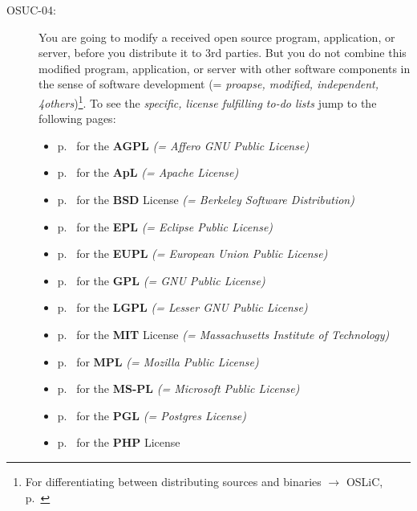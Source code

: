 \begin{description}
\item[OSUC-04:]\label{OSUC-04-DEF} You are going to modify a received open
source program, application, or server, before you distribute it to 3rd parties.
But you do not combine this modified program, application, or server with other
software components in the sense of software development (= \textit{proapse,
modified, independent, 4others})\footnote{For differentiating between
distributing sources and binaries $\rightarrow$ OSLiC, p.\
\pageref{sec:SourceBinaryDifference}}.
To see the \textit{specific, license fulfilling to-do lists} jump to the
following pages:
  \begin{itemize}
    \item p.\ \pageref{OSUC-04-AGPL} for the \textbf{AGPL}
      \textit{(= Affero GNU Public License)} 
    \item p.\ \pageref{OSUC-04-Apache20} for the \textbf{ApL}
      \textit{(= Apache License)}
    \item p.\ \pageref{OSUC-04-BSD} for the \textbf{BSD} License
      \textit{(= Berkeley Software Distribution)}
    \item p.\ \pageref{OSUC-04-EPL} for the \textbf{EPL}
      \textit{(= Eclipse Public License)}     
    \item p.\ \pageref{OSUC-04-EUPL} for the \textbf{EUPL}
      \textit{(= European Union Public License)} 
    \item p.\ \pageref{OSUC-04-GPL} for the \textbf{GPL}
       \textit{(= GNU Public License)} 
    \item p.\ \pageref{OSUC-04-LGPL} for the \textbf{LGPL}
      \textit{(= Lesser GNU Public License)}           
    \item p.\ \pageref{OSUC-04-MIT} for the \textbf{MIT} License
       \textit{(= Massachusetts Institute of Technology)} 
    \item p.\ \pageref{OSUC-04-MPL} for \textbf{MPL}
      \textit{(= Mozilla Public License)}     
    \item p.\ \pageref{OSUC-04-MS-PL} for the \textbf{MS-PL}
      \textit{(= Microsoft Public License)} 
    \item p.\ \pageref{OSUC-04-PGL} for the \textbf{PGL}
      \textit{(= Postgres License)} 
    \item p.\ \pageref{OSUC-04-PHP} for the \textbf{PHP} License 
  \end{itemize}


\end{description}
